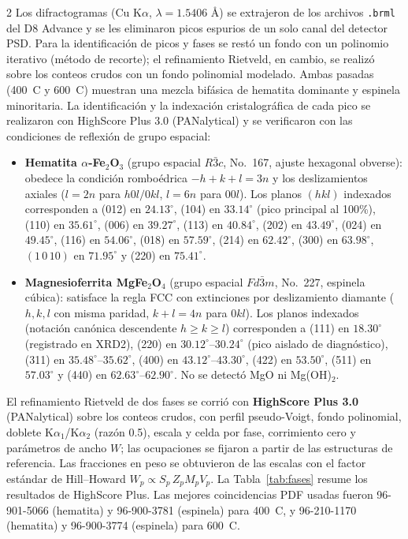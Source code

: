 \documentclass{article}
\begin{document}
\begin{multicols}{2}
Los difractogramas (Cu K$\alpha$, $\lambda = 1.5406$ \r{A}) se extrajeron de los archivos \texttt{.brml} del D8 Advance y se les eliminaron picos espurios de un solo canal del detector PSD. Para la identificación de picos y fases se restó un fondo con un polinomio iterativo (método de recorte); el refinamiento Rietveld, en cambio, se realizó sobre los conteos crudos con un fondo polinomial modelado. Ambas pasadas (400\ \textdegree C y 600\ \textdegree C) muestran una mezcla bifásica de hematita dominante y espinela minoritaria. La identificación y la indexación cristalográfica de cada pico se realizaron con HighScore Plus 3.0 (PANalytical) y se verificaron con las condiciones de reflexión de grupo espacial:
\begin{itemize}
    \item \textbf{Hematita $\alpha$-Fe$_2$O$_3$} (grupo espacial $R\bar{3}c$, No.~167, ajuste hexagonal obverse): obedece la condición romboédrica $-h + k + l = 3n$ y los deslizamientos axiales ($l=2n$ para $h0l/0kl$, $l=6n$ para $00l$). Los planos $(hkl)$ indexados corresponden a (012) en $24.13^\circ$, (104) en $33.14^\circ$ (pico principal al 100\%), (110) en $35.61^\circ$, (006) en $39.27^\circ$, (113) en $40.84^\circ$, (202) en $43.49^\circ$, (024) en $49.45^\circ$, (116) en $54.06^\circ$, (018) en $57.59^\circ$, (214) en $62.42^\circ$, (300) en $63.98^\circ$, $(1\,0\,10)$ en $71.95^\circ$ y (220) en $75.41^\circ$.
    \item \textbf{Magnesioferrita MgFe$_2$O$_4$} (grupo espacial $Fd\bar{3}m$, No.~227, espinela cúbica): satisface la regla FCC con extinciones por deslizamiento diamante ($h,k,l$ con misma paridad, $k+l=4n$ para $0kl$). Los planos indexados (notación canónica descendente $h \ge k \ge l$) corresponden a (111) en $18.30^\circ$ (registrado en XRD2), (220) en $30.12^\circ\text{--}30.24^\circ$ (pico aislado de diagnóstico), (311) en $35.48^\circ\text{--}35.62^\circ$, (400) en $43.12^\circ\text{--}43.30^\circ$, (422) en $53.50^\circ$, (511) en $57.03^\circ$ y (440) en $62.63^\circ\text{--}62.90^\circ$. No se detectó MgO ni Mg(OH)$_2$.
\end{itemize}

El refinamiento Rietveld de dos fases se corrió con \textbf{HighScore Plus 3.0} (PANalytical) sobre los conteos crudos, con perfil pseudo-Voigt, fondo polinomial, doblete K$\alpha_1$/K$\alpha_2$ (razón 0.5), escala y celda por fase, corrimiento cero y parámetros de ancho $W$; las ocupaciones se fijaron a partir de las estructuras de referencia. Las fracciones en peso se obtuvieron de las escalas con el factor estándar de Hill--Howard $W_p \propto S_p\,Z_p M_p V_p$. La Tabla~\ref{tab:fases} resume los resultados de HighScore Plus. Las mejores coincidencias PDF usadas fueron 96-901-5066 (hematita) y 96-900-3781 (espinela) para 400\ \textdegree C, y 96-210-1170 (hematita) y 96-900-3774 (espinela) para 600\ \textdegree C. 


\end{multicols}
\end{document}
